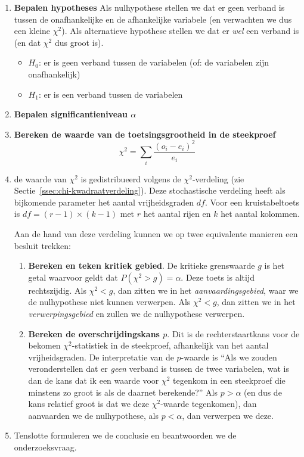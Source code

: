 \begin{enumerate}
  \item \textbf{Bepalen hypotheses}
  Als nulhypothese stellen we dat er geen verband is tussen de onafhankelijke en de afhankelijke variabele (en verwachten we dus een kleine $\chi^2$). Als alternatieve hypothese stellen we dat er \emph{wel} een verband is (en dat $\chi^2$ dus groot is).
  \begin{itemize}
    \item $H_{0}$: er is geen verband tussen de variabelen (of: de variabelen zijn onafhankelijk)
    \item $H_{1}$: er is een verband tussen de variabelen
  \end{itemize}

  \item \textbf{Bepalen significantieniveau $\alpha$}
  
  \item \textbf{Bereken de waarde van de toetsingsgrootheid in de steekproef}
  \[ \chi^{2} = \sum_{i} \frac{(o_{i} - e_{i})^{2}}{e_{i}} \]
  
  \item de waarde van $\chi^2$ is gedistribueerd volgens de $\chi^2$-verdeling (zie Sectie~\ref{ssec:chi-kwadraatverdeling}). Deze stochastische verdeling heeft als bijkomende parameter het aantal vrijheidsgraden $df$. Voor een kruistabeltoets is $df = (r - 1) \times (k - 1)$ met $r$ het aantal rijen en $k$ het aantal kolommen.
  
  Aan de hand van deze verdeling kunnen we op twee equivalente manieren een besluit trekken:
  
  \begin{enumerate}
    \item \textbf{Bereken en teken kritiek gebied}. De kritieke grenswaarde $g$ is het getal waarvoor geldt dat $P(\chi^2 > g) = \alpha$. Deze toets is altijd rechtszijdig. Als $\chi^2 < g$, dan zitten we in het \emph{aanvaardingsgebied}, waar we de nulhypothese niet kunnen verwerpen. Als $\chi^2 < g$, dan zitten we in het \emph{verwerpingsgebied} en zullen we de nulhypothese verwerpen.
    \item \textbf{Bereken de overschrijdingskans $p$}. Dit is de rechterstaartkans voor de bekomen $\chi^2$-statistiek in de steekproef, afhankelijk van het aantal vrijheidsgraden. De interpretatie van de $p$-waarde is ``Als we zouden veronderstellen dat er \emph{geen} verband is tussen de twee variabelen, wat is dan de kans dat ik een waarde voor $\chi^2$ tegenkom in een steekproef die minstens zo groot is als de daarnet berekende?'' Als $p > \alpha$ (en dus de kans relatief groot is dat we deze $ \chi^2$-waarde tegenkomen), dan aanvaarden we de nulhypothese, als $p < \alpha$, dan verwerpen we deze.
  \end{enumerate}

  \item Tenslotte formuleren we de conclusie en beantwoorden we de onderzoeksvraag.
\end{enumerate}

